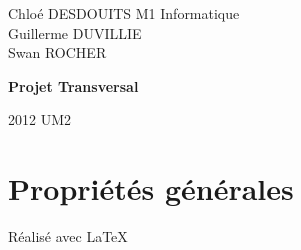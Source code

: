 \documentclass[a4paper]{report}
\begin{document}
\large
\setlength{\parskip}{5mm plus2mm minus2mm}
\lstset{language=C, showstringspaces=false, numbers=left, numberstyle=\tiny, tabsize=4}

 
 
{\setlength{\parindent}{0cm}
Chloé DESDOUITS \hfill M1 Informatique \\
Guillerme DUVILLIE \\
Swan ROCHER
}
\vfill
{\centering \Huge \bfseries Projet Transversal\par}
\vfill
2012 \hfill UM2

\setcounter{tocdepth}{1}
\tableofcontents
\thispagestyle{empty}


\chapter{Propriétés générales}


\vfill
{\raggedleft Réalisé avec \LaTeX{} \par}
\end{document}
